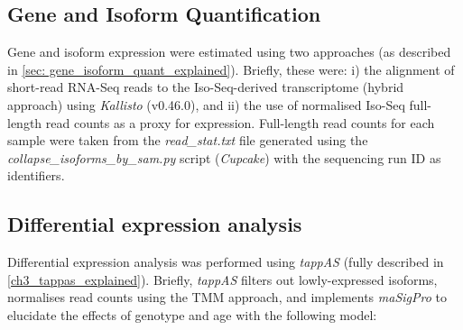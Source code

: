 \subsection{Gene and Isoform Quantification}
Gene and isoform expression were estimated using two approaches (as described in \cref{sec: gene_isoform_quant_explained}). Briefly, these were: i) the alignment of short-read RNA-Seq reads to the Iso-Seq-derived transcriptome (hybrid approach) using \textit{Kallisto}\cite{Bray2016} (v0.46.0), and ii) the use of normalised Iso-Seq full-length read counts as a proxy for expression. Full-length read counts for each sample were taken from the \textit{read\_stat.txt} file generated using the \textit{collapse\_isoforms\_by\_sam.py} script (\textit{Cupcake}) with the sequencing run ID as identifiers. 

\subsection{Differential expression analysis}
Differential expression analysis was performed using \textit{tappAS} (fully described in \cref{ch3_tappas_explained}). Briefly, \textit{tappAS} filters out lowly-expressed isoforms, normalises read counts using the TMM approach, and implements \textit{maSigPro}\cite{Conesa2006,Nueda2014,Conesa2017} to elucidate the effects of genotype and age with the following model\cite{Conesa2006}: 

